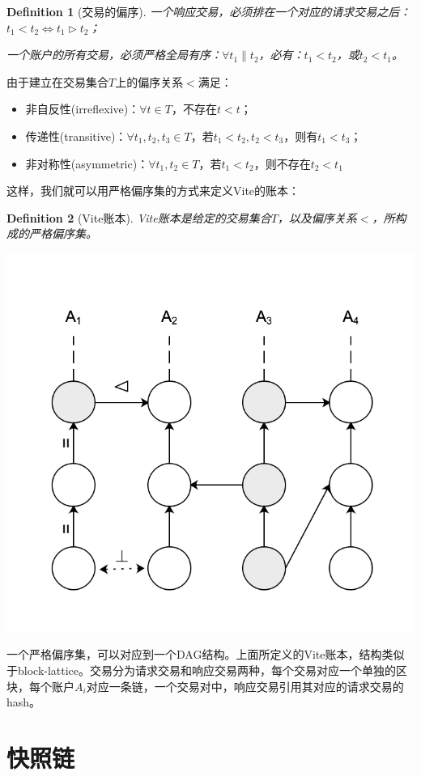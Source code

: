 \documentclass[UTF8,nofonts]{ctexart}
\newtheorem{definition}{Definition}[section]
\begin{document}
\begin{multicols}{2}
\begin{definition}[交易的偏序]
一个响应交易，必须排在一个对应的请求交易之后：$t_{1} < t_{2} \Leftrightarrow t_{1} \rhd t_{2}$；

一个账户的所有交易，必须严格全局有序：$\forall t_{1} \parallel t_{2}$，必有：$t_{1} < t_{2}$，或$t_{2} < t_{1}$。
\end{definition}

由于建立在交易集合$T$上的偏序关系$<$满足：
\begin{itemize}
	\item 非自反性(irreflexive)：$\forall t \in T$，不存在$t < t$；
	\item 传递性(transitive)：$\forall t_{1},t_{2},t_{3} \in T$，若$t_{1}<t_{2},t_{2}<t_{3}$，则有$t_{1}<t_{3}$；
	\item 非对称性(asymmetric)：$\forall t_{1},t_{2} \in T$，若$t_{1}<t_{2}$，则不存在$t_{2}<t_{1}$
\end{itemize}

这样，我们就可以用严格偏序集的方式来定义Vite的账本：

\begin{definition}[Vite账本]
Vite账本是给定的交易集合$T$，以及偏序关系$<$，所构成的严格偏序集。
\end{definition}

\includegraphics[width=.8\linewidth]{image/ledger.png}

一个严格偏序集，可以对应到一个DAG结构。上面所定义的Vite账本，结构类似于block-lattice。交易分为请求交易和响应交易两种，每个交易对应一个单独的区块，每个账户$A_{i}$对应一条链，一个交易对中，响应交易引用其对应的请求交易的hash。

\section{快照链}

\end{multicols}
\end{document}
